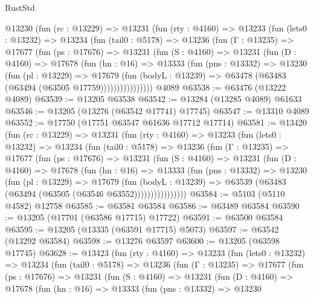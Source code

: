 \begin{lexlean}{RustStd}
\begin{coremodule}
    @13230
      (fun (rc : @13229) =>
      @13231
        (fun (rty : @4160) =>
        @13233
          (fun (lets0 : @13232) =>
          @13234
            (fun (tail0 : @5178) =>
            @13236
              (fun (Γ : @13235) =>
              @17677
                (fun (ps : @17676) =>
                @13231
                  (fun (S : @4160) =>
                  @13231
                    (fun (D : @4160) =>
                    @17678
                      (fun (hn : @16) =>
                      @13333
                        (fun (pns : @13332) =>
                        @13230
                          (fun (pl : @13229) =>
                          @17679
                            (fun (bodyL : @13239) =>
                            @63478 (@63483 (@63494 (@63505 @17759))))))))))))))))
    @4089
@63538 := @63476 (@13222 @4089)
@63539 := @13205 @63538
@63542 := @13284 (@13285 @4089) @61633
@63546 := @13205 (@13276 (@63542 @17741) @17745)
@63547 := @13310 @4089
@63552 := @17750 (@17751 @63547 @61636 @17712 @17714)
@63581 := @13420
    (fun (rc : @13229) =>
    @13231
      (fun (rty : @4160) =>
      @13233
        (fun (lets0 : @13232) =>
        @13234
          (fun (tail0 : @5178) =>
          @13236
            (fun (Γ : @13235) =>
            @17677
              (fun (ps : @17676) =>
              @13231
                (fun (S : @4160) =>
                @13231
                  (fun (D : @4160) =>
                  @17678
                    (fun (hn : @16) =>
                    @13333
                      (fun (pns : @13332) =>
                      @13230
                        (fun (pl : @13229) =>
                        @17679
                          (fun (bodyL : @13239) =>
                          @63539 (@63483 (@63494 (@63505 (@63546 @63552))))))))))))))))
@63584 := @5103 (@5110 @4582) @12758
@63585 := @63581 @63584
@63586 := @63489 @63584
@63590 := @13205 (@17701 (@63586 @17715) @17722)
@63591 := @63500 @63584
@63595 := @13205 (@13335 (@63591 @17715) @5073)
@63597 := @63542 (@13292 @63584)
@63598 := @13276 @63597
@63600 := @13205 (@63598 @17745)
@63628 := @13423
    (fun (rty : @4160) =>
    @13233
      (fun (lets0 : @13232) =>
      @13234
        (fun (tail0 : @5178) =>
        @13236
          (fun (Γ : @13235) =>
          @17677
            (fun (ps : @17676) =>
            @13231
              (fun (S : @4160) =>
              @13231
                (fun (D : @4160) =>
                @17678
                  (fun (hn : @16) =>
                  @13333
                    (fun (pns : @13332) =>
                    @13230

\end{coremodule}
\end{lexlean}

